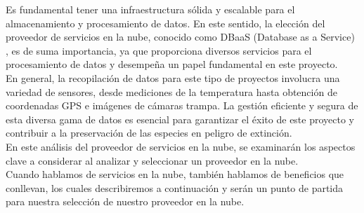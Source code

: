 Es fundamental tener una infraestructura sólida y escalable para el almacenamiento y procesamiento de datos. En este sentido, la elección del proveedor de servicios en la nube, conocido como DBaaS (Database as a Service) \cite{102}, es de suma importancia, ya que proporciona diversos servicios para el procesamiento de datos y desempeña un papel fundamental en este proyecto.\\
En general, la recopilación de datos para este tipo de proyectos involucra una variedad de sensores, desde mediciones de la temperatura hasta obtención de coordenadas GPS e imágenes de cámaras trampa. La gestión eficiente y segura de esta diversa gama de datos es esencial para garantizar el éxito de este proyecto y contribuir a la preservación de las especies en peligro de extinción.\\
En este análisis del proveedor de servicios en la nube, se examinarán los aspectos clave a considerar al analizar y seleccionar un proveedor en la nube.\\
Cuando hablamos de servicios en la nube, también hablamos de beneficios que conllevan, los cuales describiremos a continuación y serán un punto de partida para nuestra selección de nuestro proveedor en la nube.
